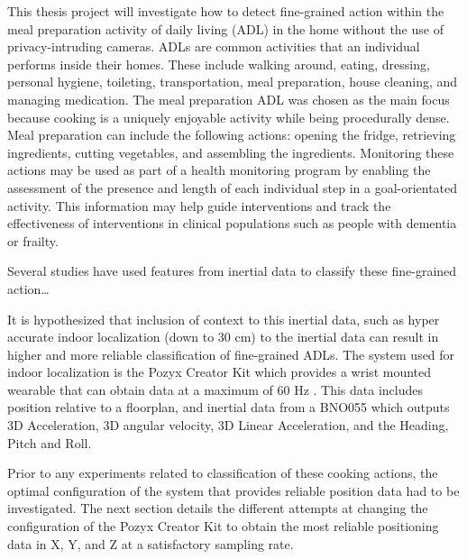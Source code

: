 This thesis project will investigate how to detect fine-grained action within the meal preparation activity of daily living 
(ADL) in the home without the use of privacy-intruding cameras. ADLs are common activities that an individual 
performs inside their homes. These include walking around, eating, dressing, personal hygiene, toileting, 
transportation, meal preparation, house cleaning, and managing medication. The meal preparation ADL was chosen as the 
main focus because cooking is a uniquely enjoyable activity while being procedurally dense. Meal preparation can include 
the following actions: opening the fridge, retrieving ingredients, cutting vegetables, and assembling the ingredients. 
Monitoring these actions may be used as part of a health monitoring program by enabling the assessment of the presence and 
length of each individual step in a goal-orientated activity. This information may help guide interventions and track 
the effectiveness of interventions in clinical populations such as people with dementia or frailty. 

Several studies have used features from inertial data to classify these fine-grained action…

It is hypothesized that inclusion of context to this inertial data, such as hyper accurate 
indoor localization (down to 30 cm) to the inertial data can result in higher and more reliable 
classification of fine-grained ADLs. 
The system used for indoor localization is the Pozyx Creator Kit which provides a wrist mounted 
wearable that can obtain data at a maximum of 60 Hz \cite{noauthor_creator_nodate}. This data includes position relative to a 
floorplan, and inertial data from a BNO055 which outputs 3D Acceleration, 3D angular velocity, 
3D Linear Acceleration, and the Heading, Pitch and Roll.

Prior to any experiments related to classification of these cooking actions, the optimal 
configuration of the system that provides reliable position data had to be investigated. 
The next section details the different attempts at changing the configuration of the Pozyx 
Creator Kit to obtain the most reliable positioning data in X, Y, and Z at a satisfactory 
sampling rate. 
